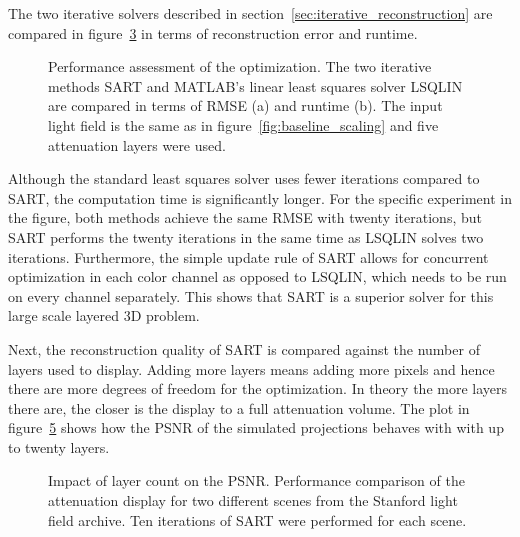 The two iterative solvers described in section~\ref{sec:iterative_reconstruction} are compared in figure~\ref{fig:sart_vs_lsqlin} in terms of reconstruction error and runtime.
\begin{figure}[tb]
	\begin{subfigure}{0.5\textwidth}
		\centering
		
		\caption{}
		\label{fig:sart_lsqlin_iterations_vs_rmse}
	\end{subfigure}%
	\begin{subfigure}{0.5\textwidth}
		\centering
		
		\caption{}
		\label{fig:sart_lsqlin_iterations_vs_time}
	\end{subfigure}%
	\caption[Performance assessment of the optimization]
			{Performance assessment of the optimization.
			 The two iterative methods \mbox{SART} and \mbox{MATLAB's} linear least squares solver LSQLIN are compared in terms of \mbox{RMSE} (a) and runtime (b).
			 The input light field is the same as in figure~\ref{fig:baseline_scaling} and five attenuation layers were used.}
	\label{fig:sart_vs_lsqlin}
\end{figure}
Although the standard least squares solver uses fewer iterations compared to SART, the computation time is significantly longer.
For the specific experiment in the figure, both methods achieve the same RMSE with twenty iterations, but SART performs the twenty iterations in the same time as LSQLIN solves two iterations.
Furthermore, the simple update rule of SART allows for concurrent optimization in each color channel as opposed to LSQLIN, which needs to be run on every channel separately.
This shows that SART is a superior solver for this large scale layered 3D problem.

Next, the reconstruction quality of SART is compared against the number of layers used to display.
Adding more layers means adding more pixels and hence there are more degrees of freedom for the optimization.
In theory the more layers there are, the closer is the display to a full attenuation volume.
The plot in figure~\ref{fig:sart_layers_vs_psnr} shows how the PSNR of the simulated projections behaves with with up to twenty layers.
\begin{figure}[tb]
	\begin{subfigure}{\textwidth}
		\centering
		
		\label{fig:sart_layers_vs_psnr}
	\end{subfigure}%
	\caption[Impact of layer count on \mbox{PSNR}]
			{Impact of layer count on the \mbox{PSNR}.
			 Performance comparison of the attenuation display for two different scenes from the Stanford light field archive.
			 Ten iterations of SART were performed for each scene.}
\end{figure}

